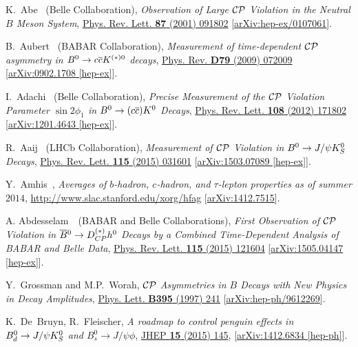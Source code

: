 \documentclass[a4paper,11pt]{article}
\begin{document}
\begin{thebibliography}{99}
K.~Abe \etal~(Belle Collaboration),
\textit{Observation of Large $\mathcal{CP}$ Violation in the Neutral $B$ Meson System},
\href{https://doi.org/10.1103/PhysRevLett.87.091802}{Phys. Rev. Lett. \textbf{87} (2001) 091802} 
[\href{https://arxiv.org/abs/hep-ex/0107061}{arXiv:hep-ex/0107061}].

B.~Aubert \etal~(BABAR Collaboration),
\textit{Measurement of time-dependent $\mathcal{CP}$ asymmetry in $B^0\to c\overline{c}K^{(*)0}$ decays}, 
\href{https://doi.org/10.1103/PhysRevD.79.072009}{Phys. Rev. \textbf{D79} (2009) 072009}
[\href{https://arxiv.org/abs/0902.1708}{arXiv:0902.1708 [hep-ex]}].

I.~Adachi \etal~(Belle Collaboration), 
\textit{Precise Measurement of the $\mathcal{CP}$ Violation Parameter $\sin{2\phi_1}$ in 
$B^0\to(c\overline{c})K^0$ Decays}, 
\href{https://doi.org/10.1103/PhysRevLett.108.171802}{Phys. Rev. Lett. \textbf{108} (2012) 171802} 
[\href{https://arxiv.org/abs/1201.4643}{arXiv:1201.4643 [hep-ex]}].

R.~Aaij \etal~(LHCb Collaboration), 
\textit{Measurement of $\mathcal{CP}$ Violation in $B^0\to J/\psi K_S^0$ Decays}, 
\href{https://doi.org/10.1103/PhysRevLett.115.031601}{Phys. Rev. Lett. \textbf{115} (2015) 031601} 
[\href{https://arxiv.org/abs/1503.07089}{arXiv:1503.07089 [hep-ex]}].

Y.~Amhis~\etal,
\textit{Averages of $b$-hadron, $c$-hadron, and $\tau$-lepton properties as of summer $2014$},
\url{http://www.slac.stanford.edu/xorg/hfag} 
[\href{https://arxiv.org/abs/1412.7515}{arXiv:1412.7515}].

A. Abdesselam~\etal~(BABAR and Belle Collaborations),
\textit{First Observation of $\mathcal{CP}$ Violation in $\overline{B}{}^0\to D_{CP}^{(*)}h^0$ Decays 
by a Combined Time-Dependent Analysis of BABAR and Belle Data},
\href{https://doi.org/10.1103/PhysRevLett.115.121604}{Phys. Rev. Lett. \textbf{115} (2015) 121604} 
[\href{https://arxiv.org/abs/1505.04147}{arXiv:1505.04147 [hep-ex]}].

Y.~Grossman and M.P.~Worah,
\textit{$\mathcal{CP}$ Asymmetries in $B$ Decays with New Physics in Decay Amplitudes},
\href{https://doi.org/10.1016/S0370-2693(97)00068-3}{Phys. Lett. \textbf{B395} (1997) 241} 
[\href{https://arxiv.org/abs/hep-ph/9612269}{arXiv:hep-ph/9612269}].

K.~De~Bruyn, R.~Fleischer,
\textit{A roadmap to control penguin effects in $B_d^0\to J/\psi K_S^0$ and $B_s^0\to J/\psi\phi$},
\href{https://doi.org/10.1007/JHEP03(2015)145}{JHEP \textbf{15} (2015) 145},
[\href{https://arxiv.org/abs/1412.6834}{arXiv:1412.6834 [hep-ph]}].


\end{thebibliography}
\end{document}
